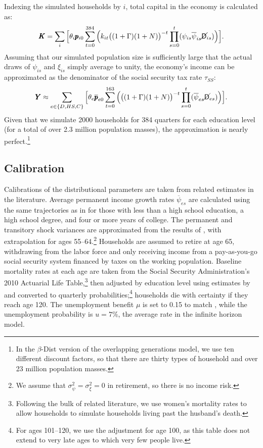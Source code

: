 \documentclass[11pt,a4paper,pdftex]{article}\usepackage[pdftex]{graphicx}\usepackage{epstopdf} \usepackage[pdftex]{hyperref}
\newcommand{\Discount}{\ensuremath{\beta}}
\newcommand{\KLev}{\ensuremath{\pmb{K}}}
\newcommand{\kRat}{\ensuremath{k}}
\newcommand{\PDies}{\ensuremath{\mathsf{D}}}
\newcommand{\pLev}{\ensuremath{\pmb{p}}}
\newcommand{\PLives}{\ensuremath{\cancel{\PDies}}}
\newcommand{\pshk}{\psi} %
\newcommand{\tshk}{\xi} %
\newcommand{\urate}{\ensuremath{u}}
\newcommand{\YLev}{\ensuremath{\pmb{Y}}}
\begin{document}
Indexing the simulated households by $i$, total capital in the economy is calculated as:
\begin{equation*}
\KLev = \sum_i \Big[ \theta_i \pLev_{i0} \sum_{t = 0}^{384} \Big( \kRat_{it} \big((1 + \Gamma)(1+N)\big)^{-t} \prod_{s=0}^t ( \pshk_{is} \overline{\pshk}_{is} \PLives_{is} ) \Big) \Big].
\end{equation*}
Assuming that our simulated population size is sufficiently large that the actual draws of $\pshk_{is}$ and $\tshk_{is}$ simply average to unity, the economy's income can be approximated as the denominator of the social security tax rate $\tau_{SS}$:
\begin{equation*}
\YLev \approx \sum_{e \in \{D,HS,C\}} \Big[ \theta_e \overline{\pLev}_{e0} \sum_{t = 0}^{163} \Big( \big((1 + \Gamma)(1+N)\big)^{-t} \prod_{s=0}^t ( \overline{\pshk}_{es} \PLives_{es} ) \Big) \Big].
\end{equation*}
Given that we simulate 2000 households for 384 quarters for each education level (for a total of over 2.3 million population masses), the approximation is nearly perfect.\footnote{In the \Discount-Dist version of the overlapping generations model, we use ten different discount factors, so that there are thirty types of household and over 23 million population masses.}

\subsection{Calibration}

Calibrations of the distributional parameters are taken from related estimates in the literature.  Average permanent income growth rates $\overline{\pshk}_{es}$ are calculated using the same trajectories as in \cite{Cagetti} for those with less than a high school education, a high school degree, and four or more years of college.  The permanent and transitory shock variances are approximated from the results of \cite{SabelhausSong}, with extrapolation for ages 55--64.\footnote{We assume that $\sigma^2_{\pshk} = \sigma^2_{\tshk} = 0$ in retirement, so there is no income risk.}  Households are assumed to retire at age 65, withdrawing from the labor force and only receiving income from a pay-as-you-go social security system financed by taxes on the working population.  Baseline mortality rates at each age are taken from the Social Security Administration's 2010 Actuarial Life Table,\footnote{Following the bulk of related literature, we use women's mortality rates to allow households to simulate households living past the husband's death.} then adjusted by education level using estimates by \cite{BrownLiebmanPollet} and converted to quarterly probabilities;\footnote{For ages 101--120, we use the adjustment for age 100, as this table does not extend to very late ages to which very few people live.} households die with certainty if they reach age 120.  The unemployment benefit $\mu$ is set to 0.15 to match \cite{Cagetti}, while the unemployment probability is $\urate = 7\%$, the average rate in the infinite horizon model.
\end{document}
